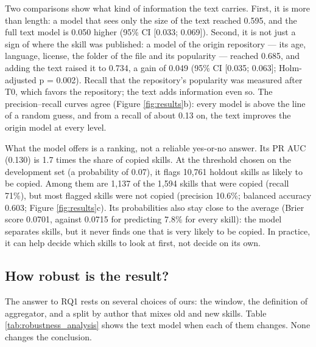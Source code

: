 Two comparisons show what kind of information the text carries. First,
it is more than length: a model that sees only the size of the text
reached 0.595, and the full text model is 0.050 higher (95\% CI
{[}0.033; 0.069{]}). Second, it is not just a sign of where the skill
was published: a model of the origin repository --- its age, language,
license, the folder of the file and its popularity --- reached 0.685,
and adding the text raised it to 0.734, a gain of 0.049 (95\% CI
{[}0.035; 0.063{]}; Holm-adjusted p = 0.002). Recall that the
repository's popularity was measured after T0, which favors the
repository; the text adds information even so. The precision--recall
curves agree (Figure \ref{fig:results}b): every model is above the line
of a random guess, and from a recall of about 0.13 on, the text improves
the origin model at every level.

What the model offers is a ranking, not a reliable yes-or-no answer. Its
PR AUC (0.130) is 1.7 times the share of copied skills. At the threshold
chosen on the development set (a probability of 0.07), it flags 10,761
holdout skills as likely to be copied. Among them are 1,137 of the 1,594
skills that were copied (recall 71\%), but most flagged skills were not
copied (precision 10.6\%; balanced accuracy 0.603; Figure
\ref{fig:results}c). Its probabilities also stay close to the average
(Brier score 0.0701, against 0.0715 for predicting 7.8\% for every
skill): the model separates skills, but it never finds one that is very
likely to be copied. In practice, it can help decide which skills to
look at first, not decide on its own.

\subsection{How robust is the result?}\label{how-robust-is-the-result}

The answer to RQ1 rests on several choices of ours: the window, the
definition of aggregator, and a split by author that mixes old and new
skills. Table \ref{tab:robustness_analysis} shows the text model when
each of them changes. None changes the conclusion.

